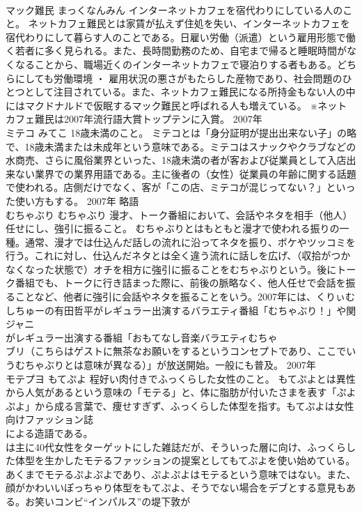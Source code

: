 \documentclass[8pt]{extreport}
\begin{document}
\begin{CJK}{UTF8}{min}
\\	マック難民	まっくなんみん	インターネットカフェを宿代わりにしている人のこと。	ネットカフェ難民とは家賃が払えず住処を失い、インターネットカフェを宿代わりにして暮らす人のことである。日雇い労働（派遣）という雇用形態で働く若者に多く見られる。また、長時間勤務のため、自宅まで帰ると睡眠時間がなくなることから、職場近くのインターネットカフェで寝泊りする者もある。どちらにしても労働環境 ・ 雇用状況の悪さがもたらした産物であり、社会問題のひとつとして注目されている。また、ネットカフェ難民になる所持金もない人の中にはマクドナルドで仮眠するマック難民と呼ばれる人も増えている。 ※ネットカフェ難民は2007年流行語大賞トップテンに入賞。	2007年	
\\	ミテコ	みてこ	18歳未満のこと。	ミテコとは「身分証明が提出出来ない子」の略で、18歳未満または未成年という意味である。ミテコはスナックやクラブなどの水商売、さらに風俗業界といった、18歳未満の者が客および従業員として入店出来ない業界での業界用語である。主に後者の（女性）従業員の年齢に関する話題で使われる。店側だけでなく、客が「この店、ミテコが混じってない？」といった使い方もする。	2007年	略語	
\\	むちゃぶり	むちゃぶり	漫才、トーク番組において、会話やネタを相手（他人）任せにし、強引に振ること。	むちゃぶりとはもともと漫才で使われる振りの一種。通常、漫才では仕込んだ話しの流れに沿ってネタを振り、ボケやツッコミを行う。これに対し、仕込んだネタとは全く違う流れに話しを広げ、（収拾がつかなくなった状態で）オチを相方に強引に振ることをむちゃぶりという。後にトーク番組でも、トークに行き詰まった際に、前後の脈略なく、他人任せで会話を振ることなど、他者に強引に会話やネタを振ることをいう。2007年には、くりぃむしちゅーの有田哲平がレギュラー出演するバラエティ番組「むちゃぶり！」や関ジャニ
\\	がレギュラー出演する番組「おもてなし音楽バラエティむちゃ
\\	ブリ（こちらはゲストに無茶なお願いをするというコンセプトであり、ここでいうむちゃぶりとは意味が異なる）」が放送開始。一般にも普及。	2007年	
\\	モテプヨ	もてぷよ	程好い肉付きでふっくらした女性のこと。	もてぷよとは異性から人気があるという意味の「モテる」と、体に脂肪が付いたさまを表す「ぷよぷよ」から成る言葉で、痩せすぎず、ふっくらした体型を指す。もてぷよは女性向けファッション誌
\\	による造語である。
\\	は主に40代女性をターゲットにした雑誌だが、そういった層に向け、ふっくらした体型を生かしたモテるファッションの提案としてもてぷよを使い始めている。あくまでモテるぷよぷよであり、ぷよぷよはモテるという意味ではない。また、顔がかわいいぽっちゃり体型をもてぷよ、そうでない場合をデブとする意見もある。お笑いコンビ“インパルス”の堤下敦が

\end{CJK}
\end{document}
